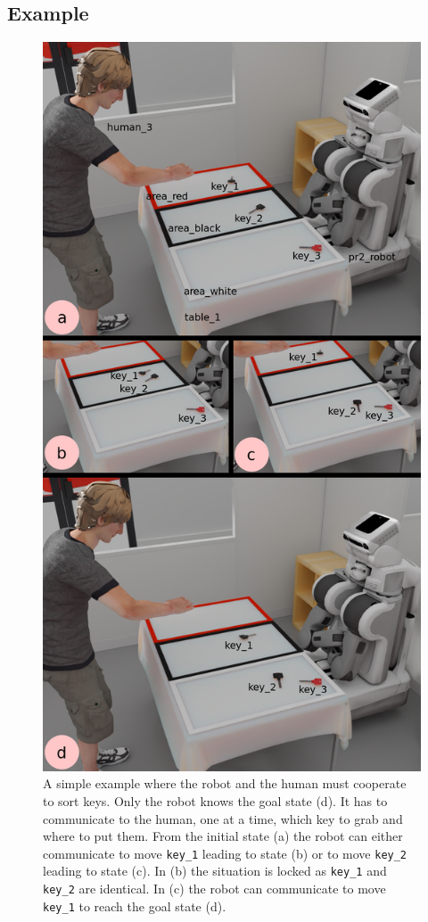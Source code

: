 \documentclass[a4paper,11pt,twoside]{StyleThese}
\begin{document}
\subsection{Example}
\begin{figure}[hbtp]
\centering
\includegraphics[scale=0.3]{figures/chapter3/Chap3illustrative.png}
\caption{A simple example where the robot and the human must cooperate to sort keys. Only the robot knows the goal state (d). It has to communicate to the human, one at a time, which key to grab and where to put them.  From the initial state (a) the robot can either communicate to move \texttt{key\_1} leading to state (b) or to move \texttt{key\_2} leading to state (c). In (b) the situation is locked as \texttt{key\_1} and \texttt{key\_2} are identical. In (c) the robot can communicate to move \texttt{key\_1} to reach the goal state (d).}
\label{fig:chap3keys}
\end{figure}
\end{document}
